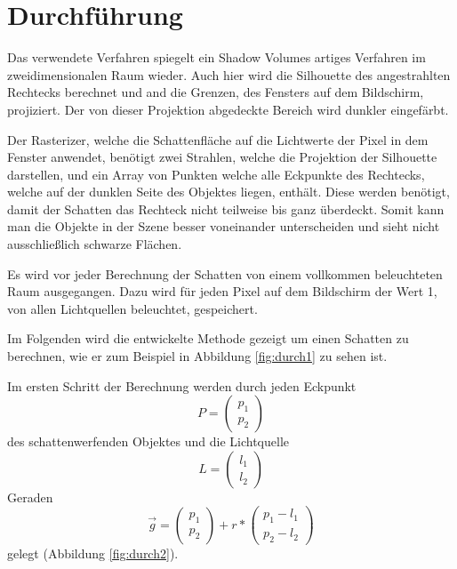 \section{Durchführung}

Das verwendete Verfahren spiegelt ein Shadow Volumes artiges Verfahren im zweidimensionalen Raum wieder. Auch hier wird die Silhouette des angestrahlten Rechtecks berechnet und and die Grenzen, des Fensters auf dem Bildschirm, projiziert. Der von dieser Projektion abgedeckte Bereich wird dunkler eingefärbt.

Der Rasterizer, welche die Schattenfläche auf die Lichtwerte der Pixel in dem Fenster anwendet, benötigt zwei Strahlen, welche die Projektion der Silhouette darstellen, und ein Array von Punkten welche alle Eckpunkte des Rechtecks, welche auf der dunklen Seite des Objektes liegen, enthält. Diese werden benötigt, damit der Schatten das Rechteck nicht teilweise bis ganz überdeckt. Somit kann man die Objekte in der Szene besser voneinander unterscheiden und sieht nicht ausschließlich schwarze Flächen.

Es wird vor jeder Berechnung der Schatten von einem vollkommen beleuchteten Raum ausgegangen. Dazu wird für jeden Pixel auf dem Bildschirm der Wert 1, von allen Lichtquellen beleuchtet, gespeichert.


Im Folgenden wird die entwickelte Methode gezeigt um einen Schatten zu berechnen, wie er zum Beispiel in Abbildung \ref{fig:durch1} zu sehen ist.


Im ersten Schritt der Berechnung werden durch jeden Eckpunkt
\begin{equation}
	P = \left(\begin{array}{c} p_1 \\ p_2 \end{array}\right)
\end{equation}
des schattenwerfenden Objektes und die Lichtquelle
\begin{equation}
	L = \left(\begin{array}{c} l_1 \\ l_2 \end{array}\right)
\end{equation}
Geraden
\begin{equation}
	\vec{g} = \left(\begin{array}{c} p_1 \\ p_2 \end{array}\right) + r * \left(\begin{array}{c} p_1 - l_1 \\ p_2 - l_2 \end{array}\right)
\end{equation}
gelegt (Abbildung \ref{fig:durch2}).

